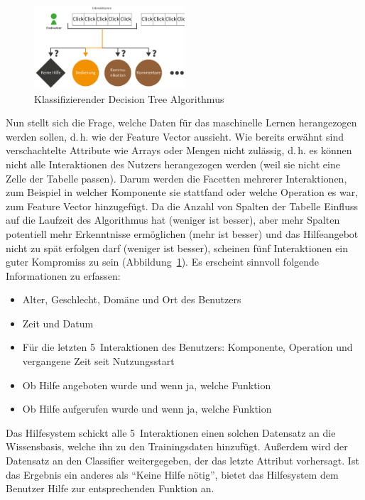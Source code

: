 \documentclass[
	headsepline,
	footsepline,
	fontsize=12pt,
	bibliography=totoc
]{scrbook}
\begin{document}
\begin{figure}[htbp]
   \centering
   \includegraphics[width=0.5\textwidth]{images/konzeption-sml-ziel.png}
   \caption{Klassifizierender Decision Tree Algorithmus}
   \label{figure:sml-ziel}
\end{figure}


Nun stellt sich die Frage, welche Daten für das maschinelle Lernen herangezogen werden sollen, d.\,h. wie der Feature Vector aussieht. Wie bereits erwähnt sind verschachtelte Attribute wie Arrays oder Mengen nicht zulässig, d.\,h. es können nicht alle Interaktionen des Nutzers herangezogen werden (weil sie nicht eine Zelle der Tabelle passen). Darum werden die Facetten mehrerer Interaktionen, zum Beispiel in welcher Komponente sie stattfand oder welche Operation es war, zum Feature Vector hinzugefügt. Da die Anzahl von Spalten der Tabelle Einfluss auf die Laufzeit des Algorithmus hat (weniger ist besser), aber mehr Spalten potentiell mehr Erkenntnisse ermöglichen (mehr ist besser) und das Hilfeangebot nicht zu spät erfolgen darf (weniger ist besser), scheinen fünf Interaktionen ein guter Kompromiss zu sein (Abbildung~\ref{figure:sml-ziel}). Es erscheint sinnvoll folgende Informationen zu erfassen:

\begin{itemize}
	\item Alter, Geschlecht, Domäne und Ort des Benutzers
	\item Zeit und Datum
	\item Für die letzten 5~Interaktionen des Benutzers: Komponente, Operation und vergangene Zeit seit Nutzungsstart
	\item Ob Hilfe angeboten wurde und wenn ja, welche Funktion
	\item Ob Hilfe aufgerufen wurde und wenn ja, welche Funktion
\end{itemize}

Das Hilfesystem schickt alle 5~Interaktionen einen solchen Datensatz an die Wissensbasis, welche ihn zu den Trainingsdaten hinzufügt. Außerdem wird der Datensatz an den Classifier weitergegeben, der das letzte Attribut vorhersagt. Ist das Ergebnis ein anderes als \enquote{Keine Hilfe nötig}, bietet das Hilfesystem dem Benutzer Hilfe zur entsprechenden Funktion an.
\end{document}
